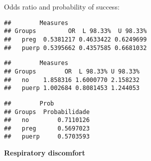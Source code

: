 \documentclass[
]{article}
\newenvironment{Shaded}{\begin{snugshade}}{\end{snugshade}}
\newcommand{\CommentTok}[1]{\textcolor[rgb]{0.56,0.35,0.01}{\textit{#1}}}
\newcommand{\KeywordTok}[1]{\textcolor[rgb]{0.13,0.29,0.53}{\textbf{#1}}}
\newcommand{\NormalTok}[1]{#1}
\newcommand{\OperatorTok}[1]{\textcolor[rgb]{0.81,0.36,0.00}{\textbf{#1}}}
\begin{document}
Odds ratio and probability of success:

\begin{Shaded}
\end{Shaded}

\begin{verbatim}
##        Measures
## Groups         OR  L 98.33%  U 98.33%
##   preg  0.5381217 0.4633422 0.6249699
##   puerp 0.5395662 0.4357585 0.6681032
\end{verbatim}

\begin{Shaded}
\end{Shaded}

\begin{verbatim}
##        Measures
## Groups        OR  L 98.33% U 98.33%
##   no    1.858316 1.6000770 2.158232
##   puerp 1.002684 0.8081453 1.244053
\end{verbatim}

\begin{Shaded}
\end{Shaded}

\begin{verbatim}
##        Prob
## Groups  Probabilidade
##   no        0.7110126
##   preg      0.5697023
##   puerp     0.5703593
\end{verbatim}

\textbf{Respiratory discomfort}
\end{document}

